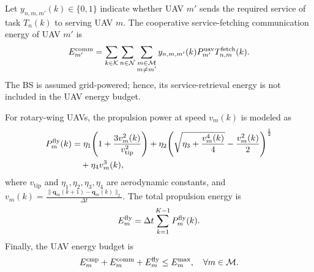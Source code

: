 \documentclass[journal]{IEEEtran}
\begin{document}
Let $y_{n,m,m'}(k)\in\{0,1\}$ indicate whether UAV $m'$ sends the required service of task $T_n(k)$ to serving UAV $m$. The cooperative service-fetching communication energy of UAV $m'$ is
\begin{equation}
\small
    E_{m'}^{\mathrm{comm}}
    =
    \sum_{k\in\mathcal{K}}
    \sum_{n\in\mathcal{N}}
    \sum_{\substack{m\in\mathcal{M}\\ m\neq m'}}
    y_{n,m,m'}(k)P_{m'}^{\mathrm{uav}}
    T_{n,m}^{\mathrm{fetch}}(k).
    \label{eq:uav_comm_energy_total}
\end{equation}
The BS is assumed grid-powered; hence, its service-retrieval energy is not included in the UAV energy budget.

For rotary-wing UAVs, the propulsion power at speed $v_m(k)$ is modeled as \cite{11500527}
\begin{equation}
\small
\begin{split}
    P_m^{\mathrm{fly}}(k)
    &= \eta_1\!\left(1+\frac{3v_m^2(k)}{v_{\mathrm{tip}}^2}\right)
    + \eta_2\!\left(\sqrt{\eta_3+\frac{v_m^4(k)}{4}}
    - \frac{v_m^2(k)}{2}\right)^{\frac{1}{2}} \\
    &\quad + \eta_4 v_m^3(k),
    \label{eq:uav_prop_power}
\end{split}
\end{equation}
where $v_{\mathrm{tip}}$ and $\eta_1,\eta_2,\eta_3,\eta_4$ are aerodynamic constants, and 
$v_m(k)=\frac{\|\mathbf{q}_m(k+1)-\mathbf{q}_m(k)\|_2}{\Delta t}$.
The total propulsion energy is
\begin{equation}
\small
    E_m^{\mathrm{fly}}
    = \Delta t \sum_{k=1}^{K-1} P_m^{\mathrm{fly}}(k).
    \label{eq:uav_fly_energy_total}
\end{equation}
Finally, the UAV energy budget is
\begin{equation}
\small
    E_m^{\mathrm{cmp}} + E_m^{\mathrm{comm}} + E_m^{\mathrm{fly}}
    \leq E_m^{\max},
    \quad \forall m\in\mathcal{M}.
    \label{eq:uav_energy_budget}
\end{equation}










\end{document}
